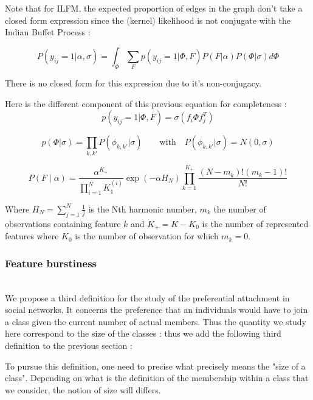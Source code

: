 Note that for ILFM, the expected proportion of edges in the graph don't take a closed form expression since the (kernel) likelihood is not conjugate with the Indian Buffet Process :

\begin{equation}
P(y_{ij}=1 | \alpha, \sigma) = \int_\Phi \sum_F p(y_{ij}=1 | \Phi, F)P(F | \alpha) P(\Phi|\sigma) d\Phi
\end{equation}

There is no closed form for this expression due to it's non-conjugacy.

Here is the different component of this previous equation for completeness \cite{IBP} :
\begin{equation}
p(y_{ij}=1 | \Phi, F) = \sigma(f_i\Phi f_j^T)
\end{equation}

\begin{equation}
p(\Phi|\sigma) = \prod_{k, k'} P(\phi_{k,k'}|\sigma) \qquad \mathrm{with} \quad P(\phi_{k,k'}|\sigma) = N(0, \sigma)
\end{equation}

\begin{equation}
P(F \mid \alpha) = \frac{\alpha^{K_+}}{\prod_{i=1}^N K_1^{(i)} } \exp(-\alpha H_N) \prod_{k=1}^{K_+} \frac{(N - m_k)!(m_k - 1)!}{N!}
\end{equation}

Where $H_N = \sum_{j=1}^N \frac{1}{j}$ is the Nth harmonic number, $m_k$ the number of observations containing feature $k$ and $K_+=K-K_0$ is the number of represented features where $K_0$ is the number of observation for which $m_k=0$.



\subsubsection{Feature burstiness}~\\

We propose a third definition for the study of the preferential attachment in social networks. It concerns the preference that an individuals would have to join a class given the current number of actual members. Thus the quantity we study here correspond to the size of the classes : thus we add the following third definition to the previous section : 

To pursue this definition, one need to precise what precisely means the "size of a class". Depending on what is the definition of the membership within a class that we consider, the notion of size will differs.


